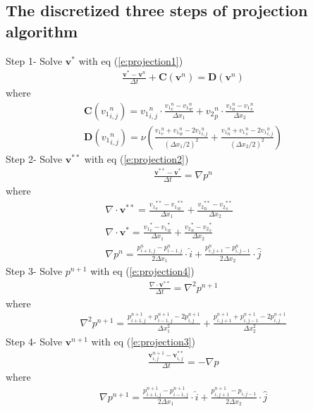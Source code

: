 \documentclass[11pt,dvips]{article}
\numberwithin{equation}{section}
\begin{document}
\subsection{The discretized three steps of projection algorithm}
Step 1- Solve $\mathbf{v}^{*}$ with eq (\ref{e:projection1})
%
\begin{align}
\frac{\mathbf{v}^{*}-\mathbf{v}^{n}}{\Delta t}+\mathbf{C}(\mathbf{v}^{n})=
\mathbf{D}(\mathbf{v}^{{n}})  \nonumber
\end{align}
%
where
%
\begin{gather}
\mathbf{C}({v_1}^n_{i,j})={v_1}^n_{i,j} \cdot \frac{{v_1}^n_{e}-{v_1}^n_{w}}{\Delta x_1}+{v_2}^n_{p} 
\cdot \frac{{v_1}^n_{n}-{v_1}^n_{s}}{\Delta x_2} \\
\mathbf{D}({v_1}^n_{i,j})=\nu (\frac{{v_1}^n_{e}+ {v_1}^n_{w}-2{v_1}^n_{i,j}}{{(\Delta x_1/2)}^2}
+\frac{{v_1}^n_{n}+ {v_1}^n_{s}-2{v_1}^n_{i,j}}{{(\Delta x_2/2)}^2})
\end{gather}
%
Step 2- Solve $\mathbf{v}^{**}$ with eq (\ref{e:projection2})
%
\begin{align}
\frac{\mathbf{v}^{**}-\mathbf{v}^{*}}{\Delta t}=\nabla p^n \nonumber
\end{align}
%
where
%
\begin{gather}
\nabla \cdot \mathbf{v}^{**}=\frac{{v_1}^{**}_{e}-{v_1}^{**}_{w}}{\Delta x_1}
+\frac{{v_2}^{**}_{n}-{v_2}^{**}_{s}}{\Delta x_2} \\
\nabla \cdot \mathbf{v}^{*}=\frac{{v_1}^{*}_{e}-{v_1}^{*}_{w}}{\Delta x_1}
+\frac{{v_2}^{*}_{n}-{v_2}^{*}_{s}}{\Delta x_2} \\
\nabla p^n=\frac{p^n_{i+1,j}-p^n_{i-1,j}}{2\Delta x_1} \cdot \hat{i}+\frac{p^n_{i,j+1}
-p^n_{i,j-1}}{2\Delta x_2}  \cdot \hat{j}
\end{gather}
%
Step 3- Solve $p^{n+1}$ with eq (\ref{e:projection4})
%
\begin{align}
\frac{\nabla \cdot \mathbf{v}^{**}}{\Delta t}=\nabla ^2 p^{n+1} \nonumber
\end{align}
%
where
%
\begin{gather}
\nabla ^2 p^{n+1}=\frac{p^{n+1}_{i+1,j}+p^{n+1}_{i-1,j}-2p^{n+1}_{i,j}}{\Delta x_1^2}
+\frac{p^{n+1}_{i,j+1}+p^{n+1}_{i,j-1}-2p^{n+1}_{i,j}}{\Delta x_2^2}
\end{gather}
%
Step 4- Solve $\mathbf{v}^{n+1}$ with eq (\ref{e:projection3})
%
\begin{align}
\frac{\mathbf{v}^{n+1}_{i,j}-\mathbf{v}^{**}_{i,j}}{\Delta t}=-\nabla p \nonumber
\end{align}
%
where
%
\begin{align}
\nabla p^{n+1}=\frac{p^{n+1}_{i+1,j}-p^{n+1}_{i-1,j}}{2\Delta x_1} \cdot 
\hat{i}+\frac{p^{n+1}_{i,j+1}
-p_{i,j-1}}{2\Delta x_2}  \cdot \hat{j}
\end{align}

\clearpage


\end{document}
